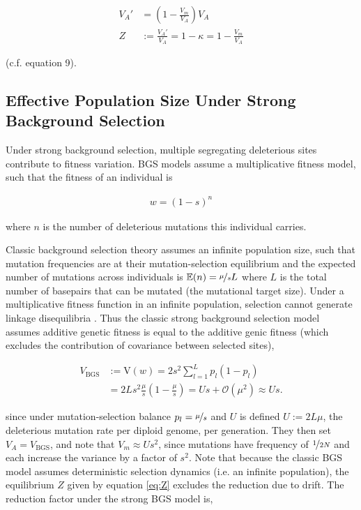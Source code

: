\documentclass[11pt]{article}
\newcommand{\E}{\mathbb{E}}
\newcommand{\V}{\text{V}}
\begin{document}
\begin{align}
  \label{eq:Z}
  V_A' &= \left(1 - \frac{V_m}{V_A}\right) V_A \\
  Z &:= \frac{V_A'}{V_A} = 1 - \kappa = 1 - \frac{V_m}{V_A}
\end{align}

(c.f. \cite{Santiago1998-bs} equation 9). 


\subsection*{Effective Population Size Under Strong Background Selection}

Under strong background selection, multiple segregating deleterious sites
contribute to fitness variation. BGS models assume a multiplicative fitness
model, such that the fitness of an individual is

\begin{align}
  w = (1-s)^{n}
\end{align}

where $n$ is the number of deleterious mutations this individual carries.

Classic background selection theory assumes an infinite population size, such
that mutation frequencies are at their mutation-selection equilibrium and the
expected number of mutations across individuals is $\E(n) = \nicefrac{\mu}{s}L$
where $L$ is the total number of basepairs that can be mutated (the mutational
target size).  Under a multiplicative fitness function in an infinite
population, selection cannot generate linkage disequilibria
\parencite{Turelli1990-kd}. Thus the classic strong background selection model
assumes additive genetic fitness is equal to the additive genic fitness (which
excludes the contribution of covariance between selected sites), 

\begin{align}
  \label{eq:va_bgs}
  V_\text{BGS} &:= \V(w) = 2 s^2 \sum_{l=1}^L p_l(1-p_l)  \\
            &= 2 L s^2 \frac{\mu}{s} \left( 1 - \frac{\mu}{s}\right) = U s + \mathcal{O}(\mu^2) \approx Us.
\end{align}

since under mutation-selection balance $p_l = \nicefrac{\mu}{s}$ and $U$ is
defined $U := 2 L \mu$, the deleterious mutation rate per diploid genome, per
generation. They then set $V_A = V_\text{BGS}$, and note that $V_m \approx
Us^2$, since mutations have frequency of $\nicefrac{1}{2N}$ and each increase
the variance by a factor of $s^2$. Note that because the classic BGS model
assumes deterministic selection dynamics (i.e. an infinite population), the
equilibrium $Z$ given by equation \eqref{eq:Z} excludes the reduction due to
drift. The reduction factor under the strong BGS model is,
\end{document}
